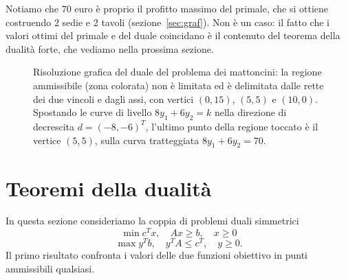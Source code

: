 Notiamo che $70$ euro è proprio il profitto massimo del primale, che si ottiene costruendo 2 sedie e 2 tavoli (sezione~\ref{sec:graf}). Non è un caso: il fatto che i valori ottimi del primale e del duale coincidano è il contenuto del teorema della dualità forte, che vediamo nella prossima sezione.

\begin{figure}[htbp]
\centering
{}
\caption{Risoluzione grafica del duale del problema dei mattoncini: la regione ammissibile (zona colorata) non è limitata ed è delimitata dalle rette dei due vincoli e dagli assi, con vertici $(0,15)$, $(5,5)$ e $(10,0)$. Spostando le curve di livello $8y_1+6y_2=k$ nella direzione di decrescita $d=(-8,-6)^T$, l'ultimo punto della regione toccato è il vertice $(5,5)$, sulla curva tratteggiata $8y_1+6y_2=70$.}
\label{fig:duale-lego}
\end{figure}

\section{Teoremi della dualità}\label{sec:teoremi-dualita}
In questa sezione consideriamo la coppia di problemi duali simmetrici
\[
\min c^T x, \quad A x \ge b, \quad x \ge 0 \tag{P}
\]
\[
\max y^T b, \quad y^T A \le c^T, \quad y \ge 0. \tag{D}
\]
Il primo risultato confronta i valori delle due funzioni obiettivo in punti ammissibili qualsiasi.

